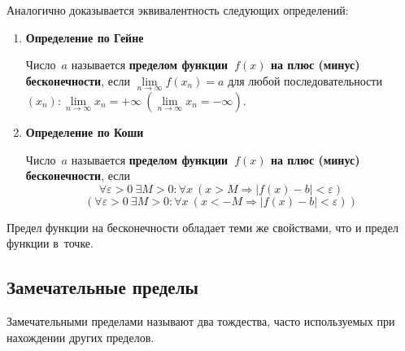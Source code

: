 Аналогично доказывается эквивалентность следующих определений:
\begin{enumerate}
	\item \textbf{Определение по Гейне}
	
	Число~$a$ называется \textbf{пределом функции~$f(x)$ на плюс (минус) бесконечности}, если $\lim\limits_{n \to \infty} f(x_n) = a$ для любой последовательности~$(x_n) \colon \lim\limits_{n \to \infty} x_n = +\infty \ (\lim\limits_{n \to \infty} x_n = -\infty)$.
	
	\item \textbf{Определение по Коши}
	
	Число~$a$ называется \textbf{пределом функции~$f(x)$ на плюс (минус) бесконечности}, если
	\begin{equation*}
	\forall \varepsilon > 0 \ \exists M > 0 \colon \forall x \ (x > M \Rightarrow |f(x) - b| < \varepsilon)
	\end{equation*}
	\begin{equation*}
	(\forall \varepsilon > 0 \ \exists M > 0 \colon \forall x \ (x < -M \Rightarrow |f(x) - b| < \varepsilon))
	\end{equation*}
\end{enumerate}

Предел функции на бесконечности обладает теми же свойствами, что и предел функции в~точке.

\subsection{Замечательные пределы}
Замечательными пределами называют два тождества, часто используемых при нахождении других пределов.

